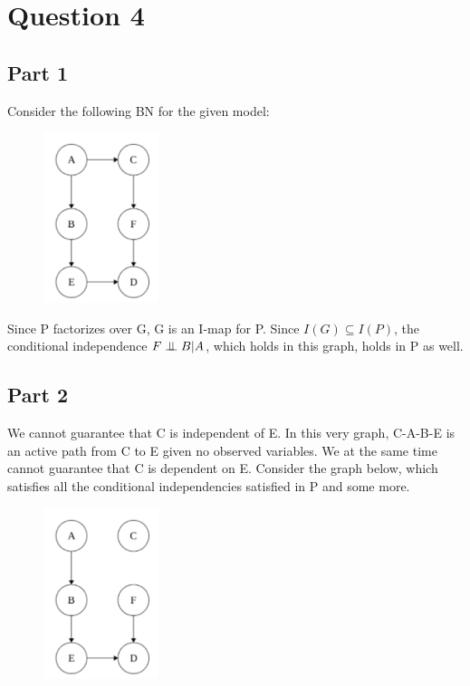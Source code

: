 \section{Question 4}
\subsection{Part 1}
Consider the following BN for the given model: 
\begin{figure}[H]
    \centering
    \includegraphics[width=0.3\textwidth]{../images/BN_Q4.png}
\end{figure}
Since P factorizes over G, G is an I-map for P. Since $I(G) \subseteq I(P)$, the conditional independence $F \perp\mkern-9.5mu\perp B | A$, which holds in this graph, holds in P as well.
\subsection{Part 2}
We cannot guarantee that C is independent of E. In this very graph, C-A-B-E is an active path from C to E given no observed variables.
We at the same time cannot guarantee that C is dependent on E. Consider the graph below, which satisfies all the conditional independencies satisfied in P and some more.
\begin{figure}[H]
    \centering
    \includegraphics[width=0.3\textwidth]{../images/BN_Q4_2.png}
\end{figure}
